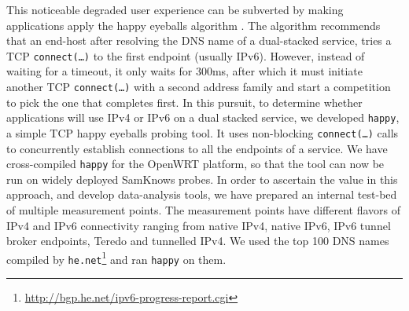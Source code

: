 This noticeable degraded user experience can be subverted by making
applications apply the happy eyeballs algorithm \cite{rfc6555}. The algorithm
recommends that an end-host after resolving the DNS name of a dual-stacked
service, tries a TCP \texttt{connect(\ldots)} to the first endpoint (usually
IPv6). However, instead of waiting for a timeout, it only waits for 300ms,
after which it must initiate another TCP \texttt{connect(\ldots)} with a
second address family and start a competition to pick the one that completes
first.  In this pursuit, to determine whether applications will use IPv4 or
IPv6 on a dual stacked service, we developed \texttt{happy}, a simple TCP
happy eyeballs probing tool. It uses non-blocking \texttt{connect(\ldots)}
calls to concurrently establish connections to all the endpoints of a service.
We have cross-compiled \texttt{happy} for the OpenWRT platform, so that the
tool can now be run on widely deployed SamKnows probes. In order to ascertain
the value in this approach, and develop data-analysis tools, we have prepared
an internal test-bed of multiple measurement points. The measurement points
have different flavors of IPv4 and IPv6 connectivity ranging from native IPv4,
native IPv6, IPv6 tunnel broker endpoints, Teredo and tunnelled IPv4. We used
the top 100 DNS names compiled by
\texttt{he.net}\footnote{\url{http://bgp.he.net/ipv6-progress-report.cgi}} and
ran \texttt{happy} on them.

